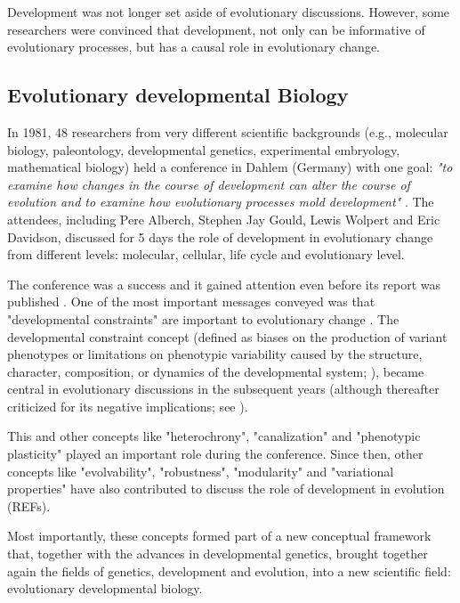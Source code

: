 Development was not longer set aside of evolutionary discussions. However, some researchers were convinced that development, not only can be informative of evolutionary processes, but has a causal role in evolutionary change.

\subsection{Evolutionary developmental Biology}

In 1981, 48 researchers from very different scientific backgrounds (e.g., molecular biology, paleontology, developmental genetics, experimental embryology, mathematical biology) 
held a conference in Dahlem (Germany) with one goal: 
\textit{"to examine how changes in the course of development can alter the course of evolution and to examine how evolutionary processes mold development"} \citep{bonner1982evolution}.
%
The attendees, including Pere Alberch, Stephen Jay Gould, Lewis Wolpert and Eric Davidson, discussed for 5 days the role of development in evolutionary change from different levels: molecular, cellular, life cycle and evolutionary level.


The conference was a success and it gained attention even before its report was published \citep{Lewin1981}. 
%
One of the most important messages conveyed was that "developmental constraints" are important to evolutionary change \citep{Alberch1982}. 
%
The developmental constraint concept (defined as biases on the production of variant phenotypes or limitations on phenotypic variability caused by the structure, character, composition, or dynamics of the developmental system; \citealp{MaynardSmith1985}), 
became central in evolutionary discussions in the subsequent years \citep{love2014conceptual} (although thereafter criticized for its negative implications; see \citealp{Salazar-Ciudad2006,love2014conceptual}).

This and other concepts like "heterochrony", "canalization" and "phenotypic plasticity" played an important role during the conference. Since then, other concepts like "evolvability", "robustness", "modularity" and "variational properties" have also contributed to discuss the role of development in evolution (REFs).

Most importantly, these concepts formed part of a new conceptual framework \citep{love2014conceptual} that, together with the advances in developmental genetics, brought together again the fields of genetics, development and evolution, into a new scientific field: evolutionary developmental biology.

